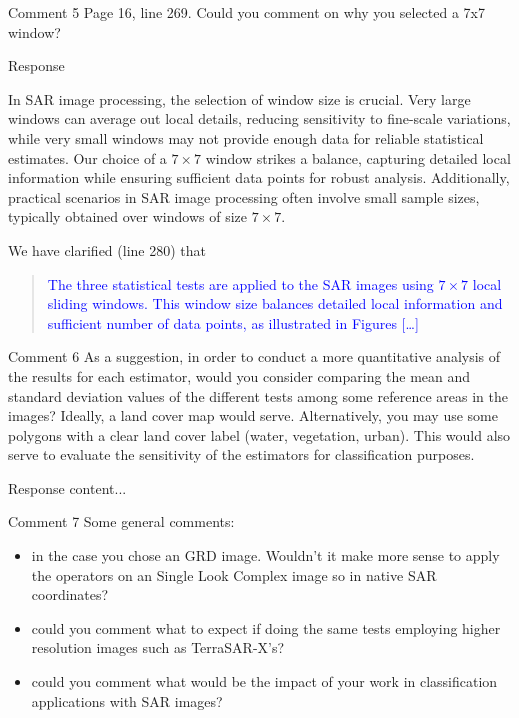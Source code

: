 \documentclass[11pt]{report}
\begin{document}
\vspace{3em}
\begin{reviewbox}{Comment 5}
Page 16, line 269. Could you comment on why you selected a 7x7 window?
\end{reviewbox}
\begin{responsebox}{Response}

In SAR image processing, the selection of window size is crucial. Very large windows can average out local details, reducing sensitivity to fine-scale variations, while very small windows may not provide enough data for reliable statistical estimates. Our choice of a $7\times 7$ window strikes a balance, capturing detailed local information while ensuring sufficient data points for robust analysis. Additionally, practical scenarios in SAR image processing often involve small sample sizes, typically obtained over windows of size $7\times 7$. 

We have clarified (line 280) that
\begin{quote}
	\textcolor{blue}{The three statistical tests are applied to the SAR images using $7\times 7$ local sliding windows.
		This window size balances detailed local information and sufficient number of data points, as illustrated in Figures [\dots]}
\end{quote}
\end{responsebox}

\vspace{3em}
\begin{reviewbox}{Comment 6}
As a suggestion, in order to conduct a more quantitative analysis of the results for each estimator, would you consider comparing the mean and standard deviation values of the different tests among some reference areas in the images? Ideally, a land cover map would serve. Alternatively, you may use some polygons with a clear land cover label (water, vegetation, urban). This would also serve to evaluate the sensitivity of the estimators for classification purposes.
\end{reviewbox}
\begin{responsebox}{Response}
	content...
\end{responsebox}

\vspace{3em}
\begin{reviewbox}{Comment 7}
Some general comments:
\begin{itemize}
	\item in the case you chose an GRD image. Wouldn't it make more sense to apply the operators on an Single Look Complex image so in native SAR coordinates?
	\item could you comment what to expect if doing the same tests employing higher resolution images such as TerraSAR-X's?
	\item could you comment what would be the impact of your work in classification applications with SAR images?
\end{itemize}
\end{reviewbox}
\end{document}
